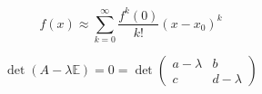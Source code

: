 \begin{multicols}{2}
    \lipsum[1-2]
    \begin{equation}\label{eq:taylor1}
        f(x) \approx \sum_{k = 0}^{\infty} \frac{f^{k}(0)}{k!} \left(x-x_{0} \right)^k
    \end{equation}
    \lipsum[3-6]
\end{multicols}

\begin{equation}\label{eq:taylor2}
    \det \left( A - \lambda \mathbb{E} \right) = 0 = \det
    \begin{pmatrix}
        a-\lambda & b\\ 
        c & d-\lambda 
    \end{pmatrix}
\end{equation}
    